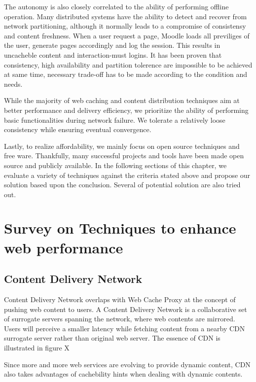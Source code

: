 The autonomy is also closely correlated to the ability of performing offline
operation. Many distributed systems have the ability to detect and recover from
network partitioning, although it normally leads to a compromise of consistensy
and content freshness. When a user request a page, Moodle loads all previliges of the user, generate pages accordingly and log the session. This results in uncacheble content and interaction-must logins.
It has been proven that consistency, high availability and partition tolerence
are impossible to be achieved at same time\cite{brewer2000towards}\cite{gilbert2002brewer}, necessary trade-off has to be made according to the condition and needs.

While the majority of web caching and content distribution techniques aim at
better performance and delivery efficiency, we prioritize the ability of
performing basic functionalities during network failure. We tolerate a
relatively loose consistency while ensuring eventual convergence.

Lastly, to realize affordability, we mainly focus on open source techniques and
free ware. Thankfully, many successful projects and tools have been made open
source and publicly available. In the following sections of this chapter, we
evaluate a variety of techniques against the criteria stated above and propose
our solution based upon the conclusion. Several of potential solution are also
tried out.


\section{Survey on Techniques to enhance web performance}

\subsection{Content Delivery Network}
Content Delivery Network overlaps with Web Cache Proxy at the concept of pushing web content to users. A Content Delivery Network is a collaborative set of surrogate servers spanning the network, where web contents are mirrored\cite{pathan2008content}. Users will perceive a smaller latency while fetching content from a nearby CDN surrogate server rather than original web server. The essence of CDN is illustrated in figure X

Since more and more web services are evolving to provide dynamic content, CDN also takes advantages of cachebility hints when dealing with dynamic contents\cite{dilley2002globally}. 


